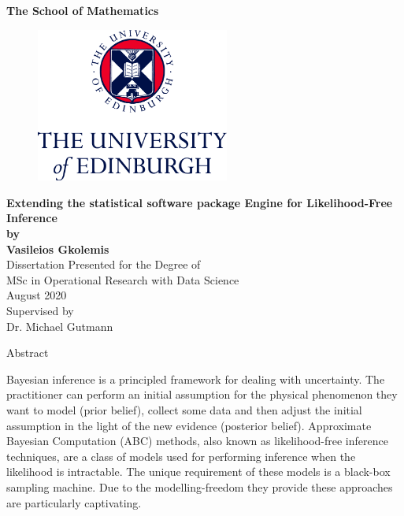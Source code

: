 \documentclass[11pt,twoside]{article}
\numberwithin{Theorem}{section}
\numberwithin{Definition}{section}
\numberwithin{Lemma}{section}
\numberwithin{Algorithm}{section}
\numberwithin{equation}{section}
\begin{document}
\pagestyle{empty}

\begin{titlepage}
\vspace*{.5em}
\center
\textbf{\large{The School of Mathematics}} \\
\vspace*{1em}
\begin{figure}[!h]
\centering
\includegraphics[width=180pt]{Thesis/images/CentredLogoCMYK.jpg}
\end{figure}
\vspace{2em}
\textbf{\Huge{Extending the statistical software package Engine for Likelihood-Free Inference}}\\[2em]
\textbf{\LARGE{by}}\\
\vspace{2em}
\textbf{\LARGE{Vasileios Gkolemis}}\\
\vspace{6.5em}
\Large{Dissertation Presented for the Degree of\\
MSc in Operational Research with Data Science}\\
\vspace{6.5em}
\Large{August 2020}\\
\vspace{3em}
\Large{Supervised by\\Dr. Michael Gutmann}
\vfill
\end{titlepage}

\cleardoublepage
\begin{center}
\Large{Abstract}
\end{center}

Bayesian inference is a principled framework for dealing with
uncertainty. The practitioner can
perform an initial assumption for the physical phenomenon they want to
model (prior belief), collect some data and then adjust the
initial assumption in the light of the new evidence (posterior
belief).  Approximate Bayesian Computation (ABC) methods, also known
as likelihood-free inference techniques, are a class of models used for
performing inference when the likelihood is intractable. The unique
requirement of these models is a black-box sampling machine. Due to
the modelling-freedom they provide these approaches are particularly
captivating.
\end{document}
